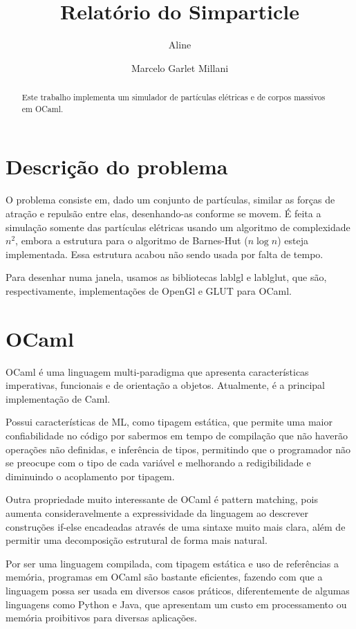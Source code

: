 \documentclass[a4paper,10pt]{article}
\title{Relatório do Simparticle}
\author{Aline \and Marcelo Garlet Millani}
\begin{document}
\maketitle

\begin{abstract}
 Este trabalho implementa um simulador de partículas elétricas e de corpos massivos em OCaml.
\end{abstract}

\section{Descrição do problema}

	O problema consiste em, dado um conjunto de partículas, similar as forças de atração e repulsão entre elas, desenhando-as conforme se movem. É feita a simulação somente das partículas elétricas usando um algoritmo de complexidade $n^2$, embora a estrutura para o algoritmo de Barnes-Hut ($n \log n$) esteja implementada. Essa estrutura acabou não sendo usada por falta de tempo.
	
	Para desenhar numa janela, usamos as bibliotecas lablgl e lablglut, que são, respectivamente, implementações de OpenGl e GLUT para OCaml.
	
\section{OCaml}

	OCaml é uma linguagem multi-paradigma que apresenta características imperativas, funcionais e de orientação a objetos. Atualmente, é a principal implementação de Caml.
	
	Possui características de ML, como tipagem estática, que permite uma maior confiabilidade no código por sabermos em tempo de compilação que não haverão operações não definidas, e inferência de tipos, permitindo que o programador não se preocupe com o tipo de cada variável e melhorando a redigibilidade e diminuindo o acoplamento por tipagem.
	
	Outra propriedade muito interessante de OCaml é pattern matching, pois aumenta consideravelmente a expressividade da linguagem ao descrever construções if-else encadeadas através de uma sintaxe muito mais clara, além de permitir uma decomposição estrutural de forma mais natural.
	
	Por ser uma linguagem compilada, com tipagem estática e uso de referências a memória, programas em OCaml são bastante eficientes, fazendo com que a linguagem possa ser usada em diversos casos práticos, diferentemente de algumas linguagens como Python e Java, que apresentam um custo em processamento ou memória proibitivos para diversas aplicações.
	
\end{document}

